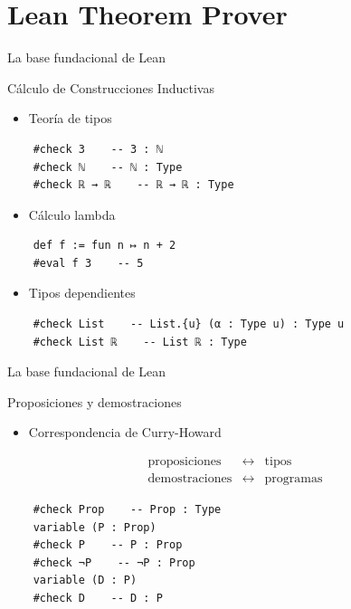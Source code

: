 \documentclass{beamer}
\begin{document}
\section{Lean Theorem Prover}


\begin{frame}[fragile]{La base fundacional de Lean}

  \begin{center}
    \large{Cálculo de Construcciones Inductivas}
  \end{center}

  \begin{itemize}
    \item Teoría de tipos
  \end{itemize}

  \begin{lstlisting}
    #check 3    -- 3 : ℕ    
    #check ℕ    -- ℕ : Type
    #check ℝ → ℝ    -- ℝ → ℝ : Type \end{lstlisting}

  \begin{itemize}
    \item Cálculo lambda
  \end{itemize}

  \begin{lstlisting}
    def f := fun n ↦ n + 2
    #eval f 3    -- 5 \end{lstlisting}

  \begin{itemize}
    \item Tipos dependientes
  \end{itemize}

  \begin{lstlisting}
    #check List    -- List.{u} (α : Type u) : Type u
    #check List ℝ    -- List ℝ : Type \end{lstlisting}

\end{frame}


\begin{frame}[fragile]{La base fundacional de Lean}

  \begin{center}
    \large{Proposiciones y demostraciones}
  \end{center}

  \begin{itemize}
    \item Correspondencia de Curry-Howard
  \end{itemize}

  $$
  \begin{array}{rcl}
    \text{proposiciones} & \longleftrightarrow & \text{tipos} \\
    \text{demostraciones} & \longleftrightarrow & \text{programas}
  \end{array}
  $$

  \begin{lstlisting}
    #check Prop    -- Prop : Type
    variable (P : Prop)
    #check P    -- P : Prop
    #check ¬P    -- ¬P : Prop
    variable (D : P)
    #check D    -- D : P \end{lstlisting}

\end{frame}
\end{document}
